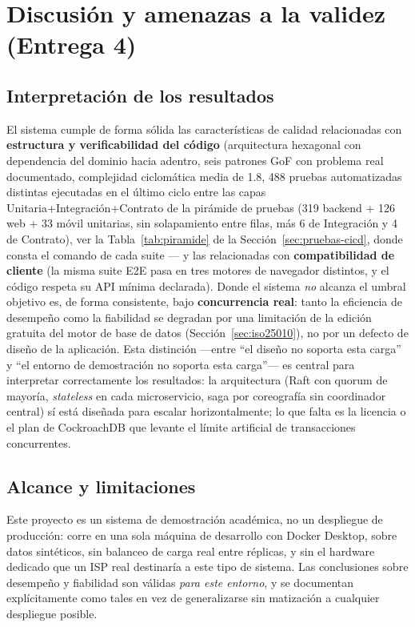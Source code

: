 \section{Discusión y amenazas a la validez (Entrega 4)}
\label{sec:discusion-e4}

\subsection{Interpretación de los resultados}

El sistema cumple de forma sólida las características de calidad relacionadas con
\textbf{estructura y verificabilidad del código} (arquitectura hexagonal con dependencia del
dominio hacia adentro, seis patrones GoF con problema real documentado, complejidad ciclomática
media de 1.8, 488 pruebas automatizadas distintas ejecutadas en el último ciclo entre las capas
Unitaria+Integración+Contrato de la pirámide de pruebas (319 backend + 126 web + 33 móvil
unitarias, sin solapamiento entre filas, más 6 de Integración y 4 de Contrato), ver la
Tabla~\ref{tab:piramide} de la Sección~\ref{sec:pruebas-cicd}, donde consta el comando de cada
suite --- y las relacionadas con \textbf{compatibilidad de cliente} (la misma suite E2E pasa en tres
motores de navegador distintos, y el código respeta su API mínima declarada). Donde el sistema
\emph{no} alcanza el umbral objetivo es, de forma consistente, bajo \textbf{concurrencia real}:
tanto la eficiencia de desempeño como la fiabilidad se degradan por una limitación de la edición
gratuita del motor de base de datos (Sección~\ref{sec:iso25010}), no por un defecto de diseño de
la aplicación. Esta distinción —entre ``el diseño no soporta esta carga'' y ``el entorno de
demostración no soporta esta carga''— es central para interpretar correctamente los resultados: la
arquitectura (Raft con quorum de mayoría, \emph{stateless} en cada microservicio, saga por
coreografía sin coordinador central) sí está diseñada para escalar horizontalmente; lo que falta
es la licencia o el plan de CockroachDB que levante el límite artificial de transacciones
concurrentes.

\subsection{Alcance y limitaciones}

Este proyecto es un sistema de demostración académica, no un despliegue de producción: corre en
una sola máquina de desarrollo con Docker Desktop, sobre datos sintéticos, sin balanceo de carga
real entre réplicas, y sin el hardware dedicado que un ISP real destinaría a este tipo de
sistema. Las conclusiones sobre desempeño y fiabilidad son válidas \emph{para este entorno}, y se
documentan explícitamente como tales en vez de generalizarse sin matización a cualquier
despliegue posible.

